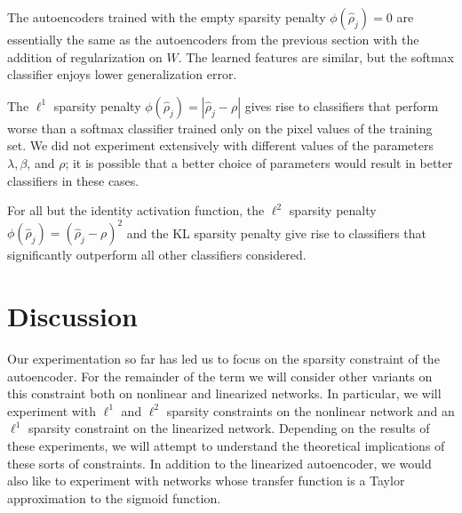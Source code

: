 \documentclass[twocolumn]{article}
\begin{document}
The autoencoders trained with the empty sparsity penalty $\phi(\hat\rho_j)=0$
are essentially the same as the autoencoders from the previous section with the
addition of regularization on $W$. The learned features are similar, but the
softmax classifier enjoys lower generalization error.

The $\ell^1$ sparsity penalty $\phi(\hat\rho_j)=|\hat\rho_j-\rho|$ gives rise
to classifiers that perform worse than a softmax classifier trained only on the
pixel values of the training set. We did not experiment extensively with different
values of the parameters $\lambda,\beta$, and $\rho$; it is possible that a better
choice of parameters would result in better classifiers in these cases.

For all but the identity activation function, 
the $\ell^2$ sparsity penalty $\phi(\hat\rho_j)=(\hat\rho_j-\rho)^2$ and the KL
sparsity penalty give rise to classifiers that significantly outperform all other
classifiers considered.

\section{Discussion}
Our experimentation so far has led us to focus on the sparsity constraint of the
autoencoder.  For the remainder of the term we will consider other variants on
this constraint both on nonlinear and linearized networks. In particular, we
will experiment with $\ell^1$ and $\ell^2$ sparsity constraints on the nonlinear
network and an $\ell^1$ sparsity constraint on the linearized network. Depending
on the results of these experiments, we will attempt to understand the
theoretical implications of these sorts of constraints. In addition to the
linearized autoencoder, we would also like to experiment with networks whose
transfer function is a Taylor approximation to the sigmoid function.

\end{document}
